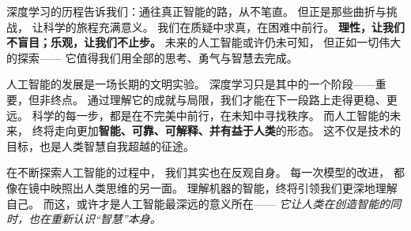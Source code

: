 深度学习的历程告诉我们：通往真正智能的路，从不笔直。  
但正是那些曲折与挑战，  
让科学的旅程充满意义。  
我们在质疑中求真，在困难中前行。  
\textbf{理性，让我们不盲目；乐观，让我们不止步。}  
未来的人工智能或许仍未可知，  
但正如一切伟大的探索——  
它值得我们用全部的思考、勇气与智慧去完成。

人工智能的发展是一场长期的文明实验。  
深度学习只是其中的一个阶段——重要，但非终点。  
通过理解它的成就与局限，我们才能在下一段路上走得更稳、更远。  
科学的每一步，都是在不完美中前行，在未知中寻找秩序。  
而人工智能的未来，  
终将走向更加\textbf{智能、可靠、可解释、并有益于人类}的形态。  
这不仅是技术的目标，也是人类智慧自我超越的征途。

在不断探索人工智能的过程中，  
我们其实也在反观自身。  
每一次模型的改进，  
都像在镜中映照出人类思维的另一面。  
理解机器的智能，终将引领我们更深地理解自己。  
而这，或许才是人工智能最深远的意义所在——  
\textit{它让人类在创造智能的同时，也在重新认识“智慧”本身。}

